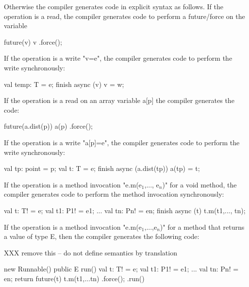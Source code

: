 Otherwise the compiler generates code in explicit syntax as
follows. If the operation is a read, the compiler generates code to
perform a future/force on the variable

\begin{xten}
future(v) { v }.force();  
\end{xten}

If the operation is a write \xcd"v=e", the compiler generates code to perform
the write synchronously:

\begin{xten}
val temp: T = e;
finish async (v) { v = w; }
\end{xten}

If the operation is a read on an array variable a[p] the compiler
generates the code:

\begin{xten}
future(a.dist(p)) { a(p) }.force();  
\end{xten}


If the operation is a write \xcd"a[p]=e", the compiler generates code to perform
the write synchronously:

\begin{xten}
val tp: point = p;
val t: T = e;
finish async (a.dist(tp)) { a(tp) = t; }
\end{xten}

If the operation is a method invocation \xcdmath"e.m(e$_1$,..., e$_n$)" for a void
method, the compiler generates code to perform the method invocation
synchronously:

\begin{xten}
val t: T! = e;
val t1: P1! = e1;
...
val tn: Pn! = en;
finish async (t) {
  t.m(t1,..., tn);
}
\end{xten}


If the operation is a method invocation
\xcdmath"e.m(e$_1$,...,e$_n$)" for a method that returns a value
of type E, then the compiler generates the following code:

XXX remove this -- do not define semantics by translation

\begin{xten}
new Runnable() {
  public E run() {
    val t: T! = e;
    val t1: P1! = e1;
    ...
    val tn: Pn! = en;
    return future(t){ t.m(t1,...tn) }.force();
  }}.run()
\end{xten}

